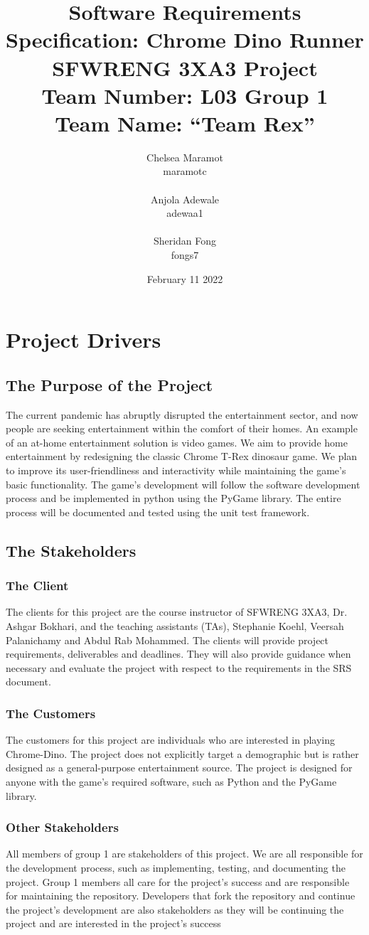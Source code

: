 \documentclass[12pt]{article}
\title{Software Requirements Specification: Chrome Dino Runner \\ \bigskip \large SFWRENG 3XA3 Project \\ \bigskip \large Team Number: L03 Group 1 \\ \large Team Name: ``Team Rex'' }
\author{Chelsea Maramot \\ maramotc \\ \\ Anjola Adewale \\ adewaa1 \\ \\ Sheridan Fong \\ fongs7 }
\date{February 11 2022}
\begin{document}
\maketitle
\section{Project Drivers}
\subsection{The Purpose of the Project}
The current pandemic has abruptly disrupted the entertainment sector, and now people are seeking entertainment within the comfort of their homes. An example of an at-home entertainment solution is video games. We aim to provide home entertainment by redesigning the classic Chrome T-Rex dinosaur game. We plan to improve its user-friendliness and interactivity while maintaining the game’s basic functionality. The game's development will follow the software development process and be implemented in python using the PyGame library. The entire process will be documented and tested using the unit test framework. 
\subsection{The Stakeholders}
\subsubsection{The Client}
The clients for this project are the course instructor of SFWRENG 3XA3, Dr. Ashgar Bokhari, and the teaching assistants (TAs), Stephanie Koehl, Veersah Palanichamy and Abdul Rab Mohammed. The clients will provide project requirements, deliverables and deadlines. They will also provide guidance when necessary and evaluate the project with respect to the requirements in the SRS document. 
\subsubsection{The Customers}
The customers for this project are individuals who are interested in playing Chrome-Dino. The project does not explicitly target a demographic but is rather designed as a general-purpose entertainment source. The project is designed for anyone with the game's required software, such as Python and the PyGame library. 
\subsubsection{Other Stakeholders}
All members of group 1 are stakeholders of this project. We are all responsible for the development process, such as implementing, testing, and documenting the project. Group 1 members all care for the project's success and are responsible for maintaining the repository. Developers that fork the repository and continue the project's development are also stakeholders as they will be continuing the project and are interested in the project's success
\end{document}
